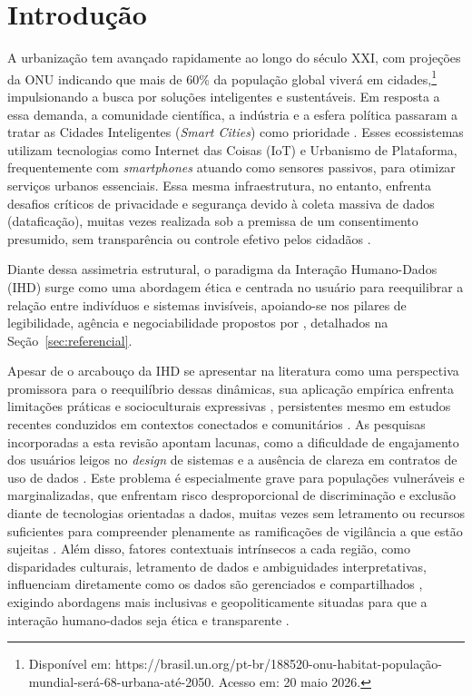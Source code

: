 \documentclass[12pt]{article}
\begin{document}
\section{Introdução}

    A urbanização tem avançado rapidamente ao longo do século XXI, com projeções da ONU indicando que mais de 60\% da população global viverá em cidades,\footnote{Disponível em: https://brasil.un.org/pt-br/188520-onu-habitat-população-mundial-será-68-urbana-até-2050. Acesso em: 20 maio 2026.} impulsionando a busca por soluções inteligentes e sustentáveis. Em resposta a essa demanda, a comunidade científica, a indústria e a esfera política passaram a tratar as Cidades Inteligentes (\textit{Smart Cities}) como prioridade \cite{EREMIA2017}. Esses ecossistemas utilizam tecnologias como Internet das Coisas (IoT) e Urbanismo de Plataforma, frequentemente com \textit{smartphones} atuando como sensores passivos, para otimizar serviços urbanos essenciais. Essa mesma infraestrutura, no entanto, enfrenta desafios críticos de privacidade e segurança devido à coleta massiva de dados (dataficação), muitas vezes realizada sob a premissa de um consentimento presumido, sem transparência ou controle efetivo pelos cidadãos \cite{streitz2019beyond}.

   Diante dessa assimetria estrutural, o paradigma da Interação Humano-Dados (IHD) surge como uma abordagem ética e centrada no usuário para reequilibrar a relação entre indivíduos e sistemas invisíveis, apoiando-se nos pilares de legibilidade, agência e negociabilidade propostos por \cite{mortier2015humandatainteractionhumanface}, detalhados na Seção~\ref{sec:referencial}.

    Apesar de o arcabouço da IHD se apresentar na literatura como uma perspectiva promissora para o reequilíbrio dessas dinâmicas, sua aplicação empírica enfrenta limitações práticas e socioculturais expressivas \cite{Victorelli2020Human}, persistentes mesmo em estudos recentes conduzidos em contextos conectados \cite{DOWTHWAITE2024} e comunitários \cite{hayes2024making}. As pesquisas incorporadas a esta revisão apontam lacunas, como a dificuldade de engajamento dos usuários leigos no \textit{design} de sistemas e a ausência de clareza em contratos de uso de dados \cite{Victorelli2020Human}. Este problema é especialmente grave para populações vulneráveis e marginalizadas, que enfrentam risco desproporcional de discriminação e exclusão diante de tecnologias orientadas a dados, muitas vezes sem letramento ou recursos suficientes para compreender plenamente as ramificações de vigilância a que estão sujeitas \cite{malgieri2020vulnerable, hayes2024making}. Além disso, fatores contextuais intrínsecos a cada região, como disparidades culturais, letramento de dados e ambiguidades interpretativas, influenciam diretamente como os dados são gerenciados e compartilhados \cite{Yuan20243615, Belizario2023Interacao}, exigindo abordagens mais inclusivas e geopoliticamente situadas para que a interação humano-dados seja ética e transparente \cite{Elhamdadi2022}.
\end{document}
